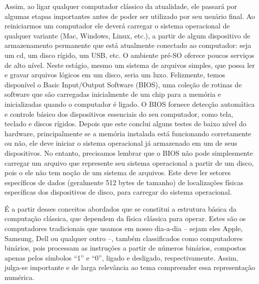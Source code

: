 Assim, ao ligar qualquer computador clássico da atualidade, ele passará por algumas etapas importantes antes de poder ser utilizado por seu usuário final. Ao reiniciarmos um computador ele deverá carregar o sistema operacional de qualquer variante (Mac, Windows, Linux, etc.), a partir de algum dispositivo de armazenamento permanente que está atualmente conectado ao computador: seja um cd, um disco rígido, um USB, etc. O ambiente pré-SO oferece poucos serviços de alto nível. Neste estágio, mesmo um sistema de arquivos simples, que possa ler e gravar arquivos lógicos em um disco, seria um luxo. Felizmente, temos disponível o Basic Input/Output Software (BIOS), uma coleção de rotinas de software que são carregadas inicialmente de um chip para a memória e inicializadas quando o computador é ligado. O BIOS fornece detecção automática e controle básico dos dispositivos essenciais do seu computador, como tela, teclado e discos rígidos. Depois que este conclui alguns testes de baixo nível do hardware, principalmente se a memória instalada está funcionando corretamente ou não, ele deve iniciar o sistema operacional já armazenado em um de seus dispositivos. No entanto, precisamos lembrar que o BIOS não pode simplesmente carregar um arquivo que represente seu sistema operacional a partir de um disco, pois o ele não tem noção de um sistema de arquivos. Este deve ler setores específicos de dados (geralmente 512 bytes de tamanho) de localizações físicas específicas dos dispositivos de disco, para carregar do sistema operacional.

É a partir desses conceitos abordados que se constitui a estrutura básica da computação clássica, que dependem da física clássica para operar. Estes são os computadores tradicionais que usamos em nosso dia-a-dia – sejam eles Apple, Samsung, Dell ou qualquer outro –, também classificados como computadores binários, pois processam as instruções a partir de números binários, compostos apenas pelos símbolos ``1'' e ``0'', ligado e desligado, respectivamente. Assim, julga-se importante e de larga relevância ao tema compreender essa representação numérica.

